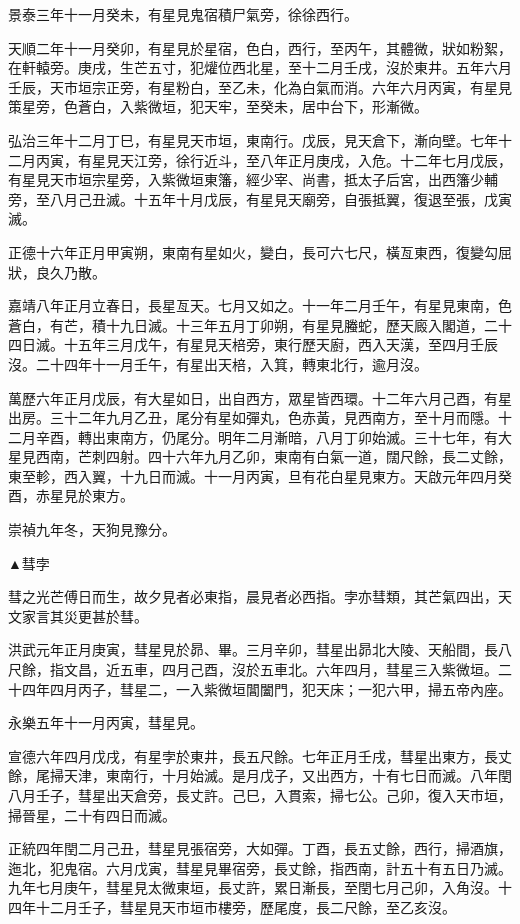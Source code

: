 \begin{pinyinscope}
景泰三年十一月癸未，有星見鬼宿積尸氣旁，徐徐西行。

天順二年十一月癸卯，有星見於星宿，色白，西行，至丙午，其體微，狀如粉絮，在軒轅旁。庚戌，生芒五寸，犯爟位西北星，至十二月壬戌，沒於東井。五年六月壬辰，天市垣宗正旁，有星粉白，至乙未，化為白氣而消。六年六月丙寅，有星見策星旁，色蒼白，入紫微垣，犯天牢，至癸未，居中台下，形漸微。

弘治三年十二月丁巳，有星見天市垣，東南行。戊辰，見天倉下，漸向壁。七年十二月丙寅，有星見天江旁，徐行近斗，至八年正月庚戌，入危。十二年七月戊辰，有星見天市垣宗星旁，入紫微垣東籓，經少宰、尚書，抵太子后宮，出西籓少輔旁，至八月己丑滅。十五年十月戊辰，有星見天廟旁，自張抵翼，復退至張，戊寅滅。

正德十六年正月甲寅朔，東南有星如火，變白，長可六七尺，橫亙東西，復變勾屈狀，良久乃散。

嘉靖八年正月立春日，長星亙天。七月又如之。十一年二月壬午，有星見東南，色蒼白，有芒，積十九日滅。十三年五月丁卯朔，有星見螣蛇，歷天廄入閣道，二十四日滅。十五年三月戊午，有星見天棓旁，東行歷天廚，西入天漢，至四月壬辰沒。二十四年十一月壬午，有星出天棓，入箕，轉東北行，逾月沒。

萬歷六年正月戊辰，有大星如日，出自西方，眾星皆西環。十二年六月己酉，有星出房。三十二年九月乙丑，尾分有星如彈丸，色赤黃，見西南方，至十月而隱。十二月辛酉，轉出東南方，仍尾分。明年二月漸暗，八月丁卯始滅。三十七年，有大星見西南，芒刺四射。四十六年九月乙卯，東南有白氣一道，闊尺餘，長二丈餘，東至軫，西入翼，十九日而滅。十一月丙寅，旦有花白星見東方。天啟元年四月癸酉，赤星見於東方。

崇禎九年冬，天狗見豫分。

▲彗孛

彗之光芒傅日而生，故夕見者必東指，晨見者必西指。孛亦彗類，其芒氣四出，天文家言其災更甚於彗。

洪武元年正月庚寅，彗星見於昴、畢。三月辛卯，彗星出昴北大陵、天船間，長八尺餘，指文昌，近五車，四月己酉，沒於五車北。六年四月，彗星三入紫微垣。二十四年四月丙子，彗星二，一入紫微垣閶闔門，犯天床；一犯六甲，掃五帝內座。

永樂五年十一月丙寅，彗星見。

宣德六年四月戊戌，有星孛於東井，長五尺餘。七年正月壬戌，彗星出東方，長丈餘，尾掃天津，東南行，十月始滅。是月戊子，又出西方，十有七日而滅。八年閏八月壬子，彗星出天倉旁，長丈許。己巳，入貫索，掃七公。己卯，復入天市垣，掃晉星，二十有四日而滅。

正統四年閏二月己丑，彗星見張宿旁，大如彈。丁酉，長五丈餘，西行，掃酒旗，迤北，犯鬼宿。六月戊寅，彗星見畢宿旁，長丈餘，指西南，計五十有五日乃滅。九年七月庚午，彗星見太微東垣，長丈許，累日漸長，至閏七月己卯，入角沒。十四年十二月壬子，彗星見天市垣市樓旁，歷尾度，長二尺餘，至乙亥沒。


\end{pinyinscope}
